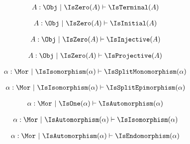 \begin{sequent}
\begin{align*}
  A:\Obj ~|~ \IsZero( A ) \vdash \IsTerminal( A )
\end{align*}
\end{sequent}

\begin{sequent}
\begin{align*}
  A:\Obj ~|~ \IsZero( A ) \vdash \IsInitial( A )
\end{align*}
\end{sequent}

\begin{sequent}
\begin{align*}
  A:\Obj ~|~ \IsZero( A ) \vdash \IsInjective( A )
\end{align*}
\end{sequent}

\begin{sequent}
\begin{align*}
  A:\Obj ~|~ \IsZero( A ) \vdash \IsProjective( A )
\end{align*}
\end{sequent}

\begin{sequent}
\begin{align*}
  \alpha:\Mor ~|~ \IsIsomorphism( \alpha ) \vdash \IsSplitMonomorphism( \alpha )
\end{align*}
\end{sequent}

\begin{sequent}
\begin{align*}
  \alpha:\Mor ~|~ \IsIsomorphism( \alpha ) \vdash \IsSplitEpimorphism( \alpha )
\end{align*}
\end{sequent}

\begin{sequent}
\begin{align*}
  \alpha:\Mor ~|~ \IsOne( \alpha ) \vdash \IsAutomorphism( \alpha )
\end{align*}
\end{sequent}

\begin{sequent}
\begin{align*}
  \alpha:\Mor ~|~ \IsAutomorphism( \alpha ) \vdash \IsIsomorphism( \alpha )
\end{align*}
\end{sequent}

\begin{sequent}
\begin{align*}
  \alpha:\Mor ~|~ \IsAutomorphism( \alpha ) \vdash \IsEndomorphism( \alpha )
\end{align*}
\end{sequent}

